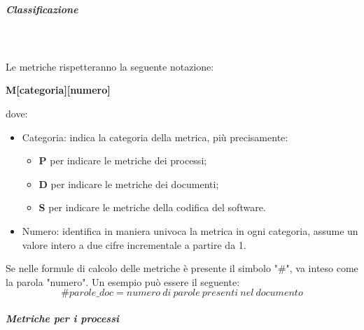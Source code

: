 \subparagraph{Classificazione}\mbox{} \\ \mbox{} \\
Le metriche rispetteranno la seguente notazione: \\
\centerline{\textbf{M[categoria][numero]}}
dove: \begin{itemize}
\item Categoria: indica la categoria della metrica, più precisamente:
\begin{itemize}
\item \textbf{P} per indicare le metriche dei processi;
\item \textbf{D} per indicare le metriche dei documenti;
\item \textbf{S} per indicare le metriche della codifica del software.
\end{itemize}
\item Numero: identifica in maniera univoca la metrica in ogni categoria, assume un valore intero a due cifre incrementale a partire da 1.
\end{itemize}
Se nelle formule di calcolo delle metriche è presente il simbolo "\#", va inteso come la parola "numero". Un esempio può essere il seguente:
\[ \#parole\_doc = numero\ di\ parole\ presenti\ nel\ documento \]
\pagebreak
\subparagraph{Metriche per i processi}  \mbox{} \\ 

